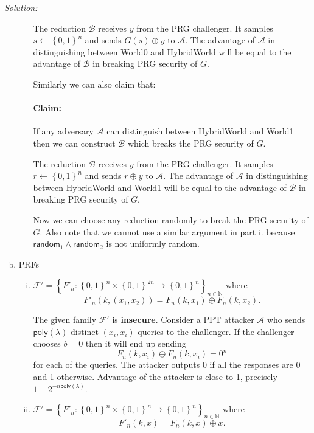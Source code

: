 \documentclass[a4paper, 11pt]{article}
\newenvironment{solution}
    {\textit{Solution:}}
    {\clearpage}
\newcommand{\bit}{\left\{0, 1\right\}}
\newcommand{\poly}{\mathsf{poly}}
\newcommand{\N}{\mathbb{N}}
\newcommand{\calA}{\mathcal{A}}
\newcommand{\calB}{\mathcal{B}}
\newcommand{\calF}{\mathcal{F}}
\newcommand{\set}[1]{\left\{ #1 \right\}}
\begin{document}
\begin{solution}
\begin{enumerate}[(a)]
\begin{enumerate}[i.]
                        The reduction $\calB$ receives $y$ from the PRG challenger. It samples $s\gets\bit^n$ and sends $G(s)\oplus y$ to $\calA$. The advantage of $\calA$ in distinguishing between World0 and HybridWorld will be equal to the advantage of $\calB$ in breaking PRG security of $G$. 
                        
                        Similarly we can also claim that:

                        \paragraph{Claim:} If any adversary $\calA$ can distinguish between HybridWorld and World1 then we can construct $\calB$ which breaks the PRG security of $G$.

                        The reduction $\calB$ receives $y$ from the PRG challenger. It samples $r\gets\bit^n$ and sends $r\oplus y$ to $\calA$. The advantage of $\calA$ in distinguishing between HybridWorld and World1 will be equal to the advantage of $\calB$ in breaking PRG security of $G$.

                        Now we can choose any reduction randomly to break the PRG security of $G$. Also note that we cannot use a similar argument in part i. because $\mathsf{random}_1\wedge\mathsf{random}_2$ is not uniformly random.

              \end{enumerate}
        \clearpage
        \item PRFs
              \begin{enumerate}[i.]
                  \item $\calF' = \set{F'_n:\bit^{n} \times \bit^{2n} \to \bit^{n}}_{n\in \N}$ where $$F'_n(k, (x_1, x_2)) = F_n(k, x_1) \oplus F_n(k, x_2).$$

                        The given family $\calF'$ is \textbf{insecure}. Consider a PPT attacker $\calA$ who sends $\poly(\lambda)$ distinct $(x_i,x_i)$ queries to the  challenger. If the challenger chooses $b=0$ then it will end up sending $$F_n(k, x_i) \oplus F_n(k, x_i)=0^n$$ for each of the queries. The attacker outputs 0 if all the responses are 0 and 1 otherwise. Advantage of the attacker is close to 1, precisely $1-2^{-n\poly(\lambda)}$.

                  \item $\calF' = \set{F'_n:\bit^{n} \times \bit^{n} \to \bit^{n}}_{n\in \N}$ where $$F'_n(k, x) = F_n(k, x) \oplus x.$$


\end{enumerate}
\end{enumerate}
\end{solution}
\end{document}
